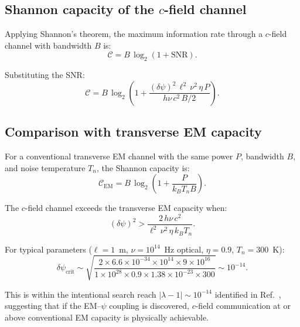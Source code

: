 \documentclass[aps,prd,twocolumn,superscriptaddress,nofootinbib,floatfix]{revtex4-2}
\newcommand{\psifield}{\psi}
\newcommand{\cvac}{c}
\newcommand{\calC}{\mathcal{C}}
\newcommand{\snr}{\text{SNR}}
\newcommand{\ee}[1]{\times 10^{#1}}
\begin{document}
\subsection{Shannon capacity of the $c$-field channel}

Applying Shannon's theorem, the maximum information rate through
a $c$-field channel with bandwidth $B$ is:
\begin{equation}
\calC = B\,\log_2\!\left(1 + \snr\right).
\label{eq:shannon}
\end{equation}

Substituting the SNR:
\begin{equation}
\boxed{
\calC = B\,\log_2\!\left(1
+ \frac{(\delta\psifield)^2\,\ell^2\,\nu^2\,\eta\,P}
{h\nu\,\cvac^2\,B/2}\right).
}
\label{eq:capacity}
\end{equation}

\subsection{Comparison with transverse EM capacity}

For a conventional transverse EM channel with the same power $P$,
bandwidth $B$, and noise temperature $T_n$, the Shannon capacity
is:
\begin{equation}
\calC_{\text{EM}} = B\,\log_2\!\left(1
+ \frac{P}{k_B T_n B}\right).
\label{eq:capacity_EM}
\end{equation}

The $c$-field channel exceeds the transverse EM capacity when:
\begin{equation}
(\delta\psifield)^2 > \frac{2\,h\nu\,\cvac^2}
{\ell^2\,\nu^2\,\eta\,k_B T_n}.
\label{eq:superiority_condition}
\end{equation}

For typical parameters ($\ell = 1$~m, $\nu = 10^{14}$~Hz optical,
$\eta = 0.9$, $T_n = 300$~K):
\begin{equation}
\delta\psifield_{\text{crit}} \sim
\sqrt{\frac{2\times 6.6\ee{-34}\times 10^{14}\times 9\ee{16}}
{1 \times 10^{28}\times 0.9\times 1.38\ee{-23}\times 300}}
\sim 10^{-14}.
\label{eq:psi_critical}
\end{equation}

This is within the intentional search reach
$|\lambda-1| \sim 10^{-14}$ identified in
Ref.~\cite{Alcock2025EMCoupling}, suggesting that if the
EM--$\psifield$ coupling is discovered, $c$-field communication
at or above conventional EM capacity is physically achievable.
\end{document}
